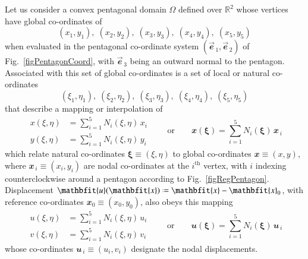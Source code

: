 Let us consider a convex pentagonal domain $\Omega$ defined over $\mathbb{R}^2$ whose vertices have global co-ordinates of
\begin{displaymath}
(x_1, y_1) , \; (x_2, y_2) , \; (x_3, y_3) , \; (x_4, y_4), \; (x_5, y_5)
\end{displaymath}
when evaluated in the pentagonal co-ordinate system $( \vec{\mathbfit{e}}_{\,1} , \vec{\mathbfit{e}}_{\,2} )$ of Fig.~\ref{figPentagonCoord}, with $\vec{\mathbfit{e}}_{\,3}$ being an outward normal to the pentagon.  Associated with this set of global co-ordinates is a set of local or natural co-ordinates
\begin{displaymath}
(\xi_1 , \eta_1) , \; (\xi_2 , \eta_2) , \; (\xi_3 , \eta_3) , \; (\xi_4 , \eta_4) , \; (\xi_5 , \eta_5)
\end{displaymath}
that describe a mapping or interpolation of
\begin{equation}
\begin{aligned}
x(\xi, \eta) & = \sum\nolimits_{i=1}^5 N_i (\xi, \eta) \, x_i \\
y(\xi, \eta) & = \sum\nolimits_{i=1}^5 N_i (\xi, \eta) \, y_i
\end{aligned} 
\qquad \text{or} \qquad
\mathbfit{x}(\boldsymbol{\xi}) = \sum_{i=1}^5 N_i (\boldsymbol{\xi}) \, 
\mathbfit{x}_{\,i}
\end{equation}
which relate natural co-ordinates $\boldsymbol{\xi} \equiv (\xi, \eta)$ to global co-ordinates $\mathbfit{x} \equiv (x, y)$, where $\mathbfit{x}_{\,i} \equiv (x_i, y_i)$ are nodal co-ordinates at the $i^{\mathrm{th}}$ vertex, with $i$ indexing counterclockwise around a pentagon according to Fig.~\ref{figRegPentagon}.  Displacement $\mathbfit{u} (\mathbfit{x}) \defeq \mathbfit{x} - \mathbfit{x}_0$, with reference co-ordinates $\mathbfit{x}_0 \equiv (x_0, y_0)$, also obeys this mapping
\begin{equation}
\begin{aligned}
u(\xi, \eta) & = \sum\nolimits_{i=1}^5 N_i (\xi, \eta) \, u_i \\
v(\xi, \eta) & = \sum\nolimits_{i=1}^5 N_i (\xi, \eta) \, v_i
\end{aligned} 
\qquad \text{or} \qquad
\mathbfit{u}(\boldsymbol{\xi}) = \sum_{i=1}^5 N_i (\boldsymbol{\xi}) \, 
\mathbfit{u}_{\,i}
\end{equation}
whose co-ordinates $\mathbfit{u}_{\,i} \equiv (u_i , v_i)$ designate the nodal displacements.


